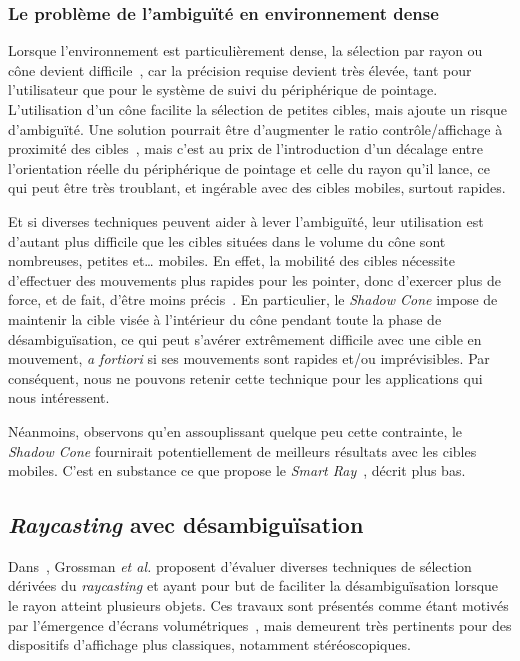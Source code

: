 	\subsubsection{Le problème de l'ambiguïté en environnement dense}
	Lorsque l'environnement est particulièrement dense, la sélection par rayon ou cône devient difficile~\cite{kopper2011rapid}, car la précision requise devient très élevée, tant pour l'utilisateur que pour le système de suivi du périphérique de pointage. L'utilisation d'un cône facilite la sélection de petites cibles, mais ajoute un risque d'ambiguïté. Une solution pourrait être d'augmenter le ratio contrôle/affichage à proximité des cibles~\cite{frees2007prism, kopper2010human}, mais c'est au prix de l'introduction d'un décalage entre l'orientation réelle du périphérique de pointage et celle du rayon qu'il lance, ce qui peut être très troublant, et ingérable avec des cibles mobiles, surtout rapides.
	
	Et si diverses techniques peuvent aider à lever l'ambiguïté, leur utilisation est d'autant plus difficile que les cibles situées dans le volume du cône sont nombreuses, petites et\ldots{} mobiles. En effet, la mobilité des cibles nécessite d'effectuer des mouvements plus rapides pour les pointer, donc d'exercer plus de force, et de fait, d'être moins précis~\cite{schmidt1979motor}. En particulier, le \emph{Shadow Cone} impose de maintenir la cible visée à l'intérieur du cône pendant toute la phase de désambiguïsation, ce qui peut s'avérer extrêmement difficile avec une cible en mouvement, \emph{a fortiori} si ses mouvements sont rapides et/ou imprévisibles. Par conséquent, nous ne pouvons retenir cette technique pour les applications qui nous intéressent.
	
	Néanmoins, observons qu'en assouplissant quelque peu cette contrainte, le \emph{Shadow Cone} fournirait potentiellement de meilleurs résultats avec les cibles mobiles. C'est en substance ce que propose le \emph{Smart Ray}~\cite{grossman2006design}, décrit plus bas.

	\subsection{\emph{Raycasting} avec désambiguïsation}
	Dans~\cite{grossman2006design}, Grossman \emph{et al.} proposent d'évaluer diverses techniques de sélection dérivées du \emph{raycasting} et ayant pour but de faciliter la désambiguïsation lorsque le rayon atteint plusieurs objets. Ces travaux sont présentés comme étant motivés par l'émergence d'écrans volumétriques~\cite{ebert1999realizing}, mais demeurent très pertinents pour des dispositifs d'affichage plus classiques, notamment stéréoscopiques.


